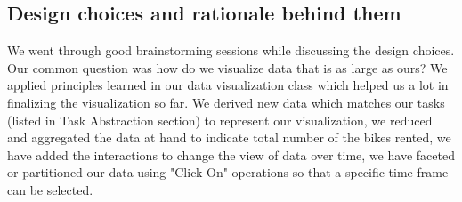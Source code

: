 \subsection{Design choices and rationale behind them}
\label{sec:design choices and rationale}

We went through good brainstorming sessions while discussing the design choices. Our common question was how do we visualize data that is as large as ours? 
We applied principles learned in our data visualization class which helped us a lot in finalizing the visualization so far. We derived new data which matches our tasks (listed in Task Abstraction section) to represent our visualization, we reduced and aggregated the data at hand to indicate total number of the bikes rented, we have added the interactions to change the view of data over time, we have faceted or partitioned our data using "Click On" operations so that a specific time-frame can be selected. 

